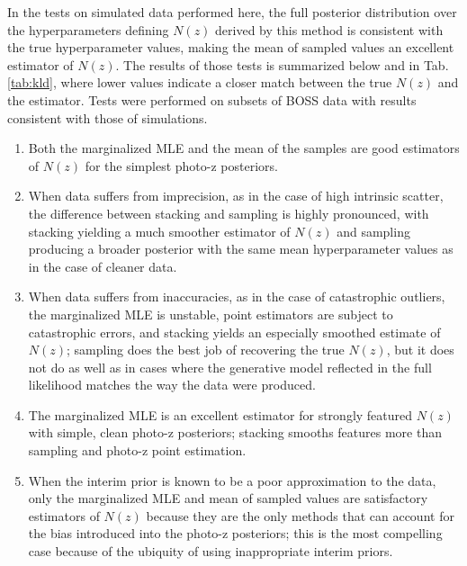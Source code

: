\documentclass[preprint]{aastex}
\begin{document}
In the tests on simulated data performed here, the full posterior distribution 
over the hyperparameters defining $N(z)$ derived by this method is consistent 
with the true hyperparameter values, making the mean of sampled values an 
excellent estimator of $N(z)$.  The results of those tests is summarized below 
and in Tab. \ref{tab:kld}, where lower values indicate a closer match between 
the true $N(z)$ and the estimator.  Tests were performed on subsets of BOSS 
data with results consistent with those of simulations.

\begin{enumerate}
\item Both the marginalized MLE and the mean of the samples are good estimators 
of $N(z)$ for the simplest photo-z posteriors.
\item When data suffers from imprecision, as in the case of high intrinsic 
scatter, the difference between stacking and sampling is highly pronounced, 
with stacking yielding a much smoother estimator of $N(z)$ and sampling 
producing a broader posterior with the same mean hyperparameter values as in 
the case of cleaner data.
\item When data suffers from inaccuracies, as in the case of catastrophic 
outliers, the marginalized MLE is unstable, point estimators are subject to 
catastrophic errors, and stacking yields an especially smoothed estimate of 
$N(z)$; sampling does the best job of recovering the true $N(z)$, but it does 
not do as well as in cases where the generative model reflected in the full 
likelihood matches the way the data were produced.
\item The marginalized MLE is an excellent estimator for strongly featured 
$N(z)$ with simple, clean photo-z posteriors; stacking smooths features more 
than sampling and photo-z point estimation.
\item When the interim prior is known to be a poor approximation to the data, 
only the marginalized MLE and mean of sampled values are satisfactory 
estimators of $N(z)$ because they are the only methods that can account for the 
bias introduced into the photo-z posteriors; this is the most compelling case 
because of the ubiquity of using inappropriate interim priors.
\end{enumerate}
\end{document}
